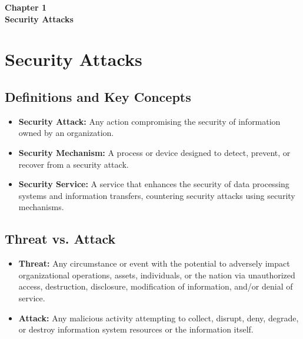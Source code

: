 \clearpage
\thispagestyle{empty} 
\begin{center}
    \vspace*{\fill} 
    \Huge \textbf{Chapter 1} \\
    \Huge \textbf{Security Attacks}
    \vspace*{\fill}
\end{center}
\clearpage

\chapter{Security Attacks}

\section{Definitions and Key Concepts}
\begin{itemize}
    \item \textbf{Security Attack:} Any action compromising the security of information owned by an organization.
    \item \textbf{Security Mechanism:} A process or device designed to detect, prevent, or recover from a security attack.
    \item \textbf{Security Service:} A service that enhances the security of data processing systems and information transfers, countering security attacks using security mechanisms.
\end{itemize}

\section{Threat vs. Attack}
\begin{itemize}
    \item \textbf{Threat:} Any circumstance or event with the potential to adversely impact organizational operations, assets, individuals, or the nation via unauthorized access, destruction, disclosure, modification of information, and/or denial of service.
    \item \textbf{Attack:} Any malicious activity attempting to collect, disrupt, deny, degrade, or destroy information system resources or the information itself.
\end{itemize}

